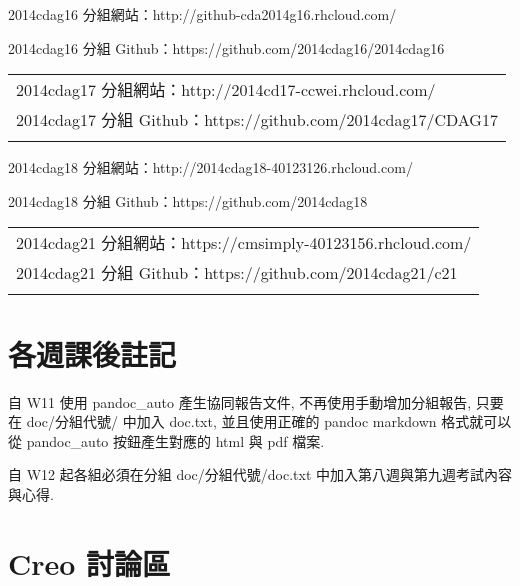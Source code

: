 \documentclass[]{article}
\begin{document}
2014cdag16 分組網站：http://github-cda2014g16.rhcloud.com/

2014cdag16 分組 Github：https://github.com/2014cdag16/2014cdag16

\begin{longtable}[c]{@{}l@{}}
\toprule\addlinespace
\begin{minipage}[t]{0.09\columnwidth}\raggedright
2014cdag17 分組網站：http://2014cd17-ccwei.rhcloud.com/
\end{minipage}
\\\addlinespace
\begin{minipage}[t]{0.09\columnwidth}\raggedright
2014cdag17 分組 Github：https://github.com/2014cdag17/CDAG17
\end{minipage}
\\\addlinespace
\bottomrule
\end{longtable}

2014cdag18 分組網站：http://2014cdag18-40123126.rhcloud.com/

2014cdag18 分組 Github：https://github.com/2014cdag18

\begin{longtable}[c]{@{}l@{}}
\toprule\addlinespace
\begin{minipage}[t]{0.09\columnwidth}\raggedright
2014cdag21 分組網站：https://cmsimply-40123156.rhcloud.com/
\end{minipage}
\\\addlinespace
\begin{minipage}[t]{0.09\columnwidth}\raggedright
2014cdag21 分組 Github：https://github.com/2014cdag21/c21
\end{minipage}
\\\addlinespace
\bottomrule
\end{longtable}

\section{各週課後註記}\label{ux5404ux9031ux8ab2ux5f8cux8a3bux8a18}

自 W11 使用 pandoc\_auto 產生協同報告文件, 不再使用手動增加分組報告,
只要在 doc/分組代號/ 中加入 doc.txt, 並且使用正確的 pandoc markdown
格式就可以從 pandoc\_auto 按鈕產生對應的 html 與 pdf 檔案.

自 W12 起各組必須在分組 doc/分組代號/doc.txt
中加入第八週與第九週考試內容與心得.

\section{Creo 討論區}\label{creo-ux8a0eux8ad6ux5340}
\end{document}
